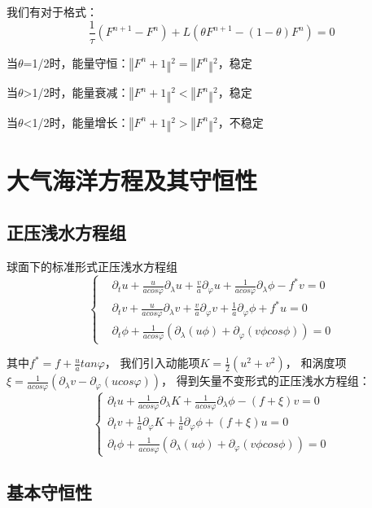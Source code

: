 \documentclass{article}
\begin{document}
我们有对于格式：
$$\frac{1}{\tau}(F^{n+1}-F^n)+L(\theta F^{n+1} - (1-\theta) F^n)=0$$

当$\theta$=1/2时，能量守恒：$‖F^n+1‖^2=‖F^n‖^2$，稳定

当$\theta$>1/2时，能量衰减：$‖F^n+1‖^2<‖F^n‖^2$，稳定

当$\theta$<1/2时，能量增长：$‖F^n+1‖^2>‖F^n‖^2$，不稳定

\newpage

\section{大气海洋方程及其守恒性}
\subsection{正压浅水方程组}
球面下的标准形式正压浅水方程组
$$\begin{cases}
&{\partial_{t}u + \frac{u}{acos\varphi}\partial_{\lambda}u + \frac{v}{a}\partial_{\varphi}u + \frac{1}{acos\varphi}\partial_{\lambda}\phi - f^{*}v = 0} \\
&{\partial_{t}v + \frac{u}{acos\varphi}\partial_{\lambda}v + \frac{v}{a}\partial_{\varphi}v + \frac{1}{a}\partial_{\varphi}\phi + f^{*}u = 0} \\
&{\partial_{t}\phi + \frac{1}{acos\varphi}\left( {\partial_{\lambda}\left( {u\phi} \right) + \partial_{\varphi}\left( {v\phi cos\phi} \right)} \right) = 0}
\end{cases} $$

其中$f^{*} = f + \frac{u}{a}tan\varphi$，
我们引入动能项$K = \frac{1}{2}\left( u^{2} + v^{2} \right)$，
和涡度项$\xi = \frac{1}{acos\varphi}\left( {\partial_{\lambda}v - \partial_{\varphi}\left( {ucos\varphi} \right)} \right)$，
得到矢量不变形式的正压浅水方程组：
$$\begin{cases}
{\partial_{t}u + \frac{1}{acos\varphi}\partial_{\lambda}K + \frac{1}{acos\varphi}\partial_{\lambda}\phi - \left( {f + \xi} \right)v= 0} \\
{\partial_{t}v + \frac{1}{a}\partial_{\varphi}K + \frac{1}{a}\partial_{\varphi}\phi + \left( {f + \xi} \right)u = 0} \\
{\partial_{t}\phi + \frac{1}{acos\varphi}\left( {\partial_{\lambda}\left( {u\phi} \right) + \partial_{\varphi}\left( {v\phi cos\phi} \right)} \right)= 0}
\end{cases}$$

\subsection{基本守恒性}
\end{document}

